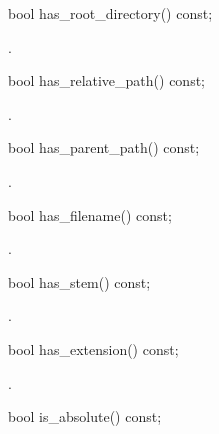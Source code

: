 %
\begin{itemdecl}
bool has_root_directory() const;
\end{itemdecl}

\begin{itemdescr}
\pnum
\returns {}.
\end{itemdescr}

%
\begin{itemdecl}
bool has_relative_path() const;
\end{itemdecl}

\begin{itemdescr}
\pnum
\returns {}.
\end{itemdescr}

%
\begin{itemdecl}
bool has_parent_path() const;
\end{itemdecl}

\begin{itemdescr}
\pnum
\returns {}.
\end{itemdescr}

%
\begin{itemdecl}
bool has_filename() const;
\end{itemdecl}

\begin{itemdescr}
\pnum
\returns {}.
\end{itemdescr}

%
\begin{itemdecl}
bool has_stem() const;
\end{itemdecl}

\begin{itemdescr}
\pnum
\returns {}.
\end{itemdescr}

%
\begin{itemdecl}
bool has_extension() const;
\end{itemdecl}

\begin{itemdescr}
\pnum
\returns {}.
\end{itemdescr}

%
\begin{itemdecl}
bool is_absolute() const;
\end{itemdecl}


